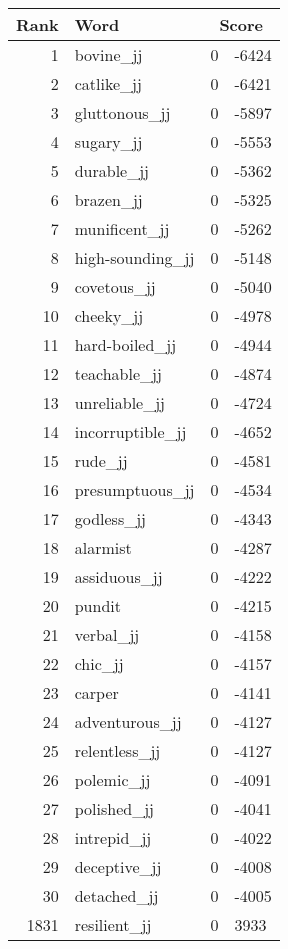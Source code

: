 \begin{longtable}[!htbp]{| rlr@{.}l |}
    \hline
    \textbf{Rank} & \textbf{Word} & \multicolumn{2}{c|}{\textbf{Score}} \\
    \hline
    \endhead
    1 & bovine\_jj & 0 & -6424 \\
    2 & catlike\_jj & 0 & -6421 \\
    3 & gluttonous\_jj & 0 & -5897 \\
    4 & sugary\_jj & 0 & -5553 \\
    5 & durable\_jj & 0 & -5362 \\
    6 & brazen\_jj & 0 & -5325 \\
    7 & munificent\_jj & 0 & -5262 \\
    8 & high-sounding\_jj & 0 & -5148 \\
    9 & covetous\_jj & 0 & -5040 \\
    10 & cheeky\_jj & 0 & -4978 \\
    11 & hard-boiled\_jj & 0 & -4944 \\
    12 & teachable\_jj & 0 & -4874 \\
    13 & unreliable\_jj & 0 & -4724 \\
    14 & incorruptible\_jj & 0 & -4652 \\
    15 & rude\_jj & 0 & -4581 \\
    16 & presumptuous\_jj & 0 & -4534 \\
    17 & godless\_jj & 0 & -4343 \\
    18 & alarmist & 0 & -4287 \\
    19 & assiduous\_jj & 0 & -4222 \\
    20 & pundit & 0 & -4215 \\
    21 & verbal\_jj & 0 & -4158 \\
    22 & chic\_jj & 0 & -4157 \\
    23 & carper & 0 & -4141 \\
    24 & adventurous\_jj & 0 & -4127 \\
    25 & relentless\_jj & 0 & -4127 \\
    26 & polemic\_jj & 0 & -4091 \\
    27 & polished\_jj & 0 & -4041 \\
    28 & intrepid\_jj & 0 & -4022 \\
    29 & deceptive\_jj & 0 & -4008 \\
    30 & detached\_jj & 0 & -4005 \\
    1831 & resilient\_jj & 0 & 3933 \\

\end{longtable}
